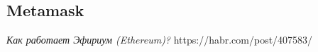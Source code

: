\documentclass{article}
\begin{document}
\subsection{Metamask}



\begin{thebibliography}{9}

	  \emph{Как работает Эфириум (Ethereum)?}
	  https://habr.com/post/407583/

\end{thebibliography}
\end{document}
